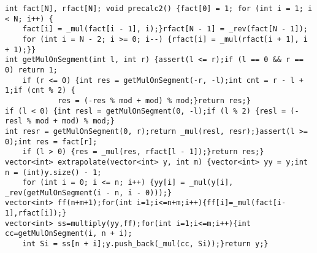 \documentclass[a4paper,12pt]{article}
\begin{document}
\begin{verbatim}
int fact[N], rfact[N]; void precalc2() {fact[0] = 1; for (int i = 1; i < N; i++) {
    fact[i] = _mul(fact[i - 1], i);}rfact[N - 1] = _rev(fact[N - 1]);
    for (int i = N - 2; i >= 0; i--) {rfact[i] = _mul(rfact[i + 1], i + 1);}}
int getMulOnSegment(int l, int r) {assert(l <= r);if (l == 0 && r == 0) return 1;
    if (r <= 0) {int res = getMulOnSegment(-r, -l);int cnt = r - l + 1;if (cnt % 2) {
            res = (-res % mod + mod) % mod;}return res;}
if (l < 0) {int resl = getMulOnSegment(0, -l);if (l % 2) {resl = (-resl % mod + mod) % mod;}
int resr = getMulOnSegment(0, r);return _mul(resl, resr);}assert(l >= 0);int res = fact[r];
    if (l > 0) {res = _mul(res, rfact[l - 1]);}return res;}
vector<int> extrapolate(vector<int> y, int m) {vector<int> yy = y;int n = (int)y.size() - 1;
    for (int i = 0; i <= n; i++) {yy[i] = _mul(y[i], _rev(getMulOnSegment(i - n, i - 0)));}
vector<int> ff(n+m+1);for(int i=1;i<=n+m;i++){ff[i]=_mul(fact[i-1],rfact[i]);}
vector<int> ss=multiply(yy,ff);for(int i=1;i<=m;i++){int cc=getMulOnSegment(i, n + i);
    int Si = ss[n + i];y.push_back(_mul(cc, Si));}return y;}
\end{verbatim}

\end{document}
